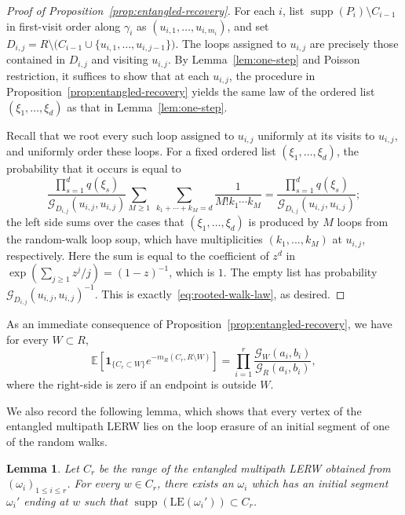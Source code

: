 \documentclass[11pt]{article}
\numberwithin{equation}{section}
\newcommand{\E}{\mathbb{E}}
\newcommand{\1}{\mathbf{1}}
\newcommand{\LE}{\mathrm{LE}}
\newtheorem{lemma}[theorem]{Lemma}
\newcommand{\supp}{\operatorname{supp}}
\newcommand{\one}{\mathbf 1}
\newcommand{\Gc}{\mathcal G}
\begin{document}
\begin{proof}[Proof of Proposition~\ref{prop:entangled-recovery}]
For each $i$, list $\supp(P_i)\setminus C_{i-1}$ in first-visit order along
$\gamma_i$ as $(u_{i,1},\ldots,u_{i,m_i})$, and set
$D_{i,j}=R\setminus\bigl(C_{i-1}\cup \{u_{i,1},\ldots,u_{i,j-1}\}\bigr)$.  The loops assigned to $u_{i,j}$ are precisely those contained in
$D_{i,j}$ and visiting $u_{i,j}$. By Lemma~\ref{lem:one-step} and Poisson restriction, it suffices to show that at each $u_{i,j}$, the procedure in Proposition~\ref{prop:entangled-recovery} yields the same law of the ordered list $(\xi_1,\ldots,\xi_d)$ as that in Lemma~\ref{lem:one-step}.

Recall that we root every such loop assigned to $u_{i,j}$ uniformly at its visits to
$u_{i,j}$, and uniformly order these loops.  For a fixed ordered list
$(\xi_1,\ldots,\xi_d)$, the probability that it occurs is equal to
\[
 \frac{\prod_{s=1}^d q(\xi_s)}{\Gc_{D_{i,j}}(u_{i,j},u_{i,j})}
 \sum_{M\ge1}\ \sum_{k_1+\cdots+k_M=d}
 \frac1{M!k_1\cdots k_M}
 =\frac{\prod_{s=1}^d q(\xi_s)}{\Gc_{D_{i,j}}(u_{i,j},u_{i,j})};
\]
the left side sums over the cases that $(\xi_1,\ldots,\xi_d)$ is produced by $M$ loops from the random-walk loop soup, which have multiplicities $(k_1,...,k_M)$ at $u_{i,j}$, respectively. 
Here the sum is equal to the coefficient of $z^d$ in
$\exp(\sum_{j\ge1}z^j/j)=(1-z)^{-1}$, which is $1$. The empty list has probability
$\Gc_{D_{i,j}}(u_{i,j},u_{i,j})^{-1}$. This is exactly~\eqref{eq:rooted-walk-law}, as desired.
\end{proof}

As an immediate consequence of Proposition~\ref{prop:entangled-recovery}, we have for every $W\subset R$,
\begin{equation}\label{eq:multipath-recovery-at-one}
 \E\left[
  \one_{\{C_r\subset W\}}
  e^{-m_R(C_r,R\setminus W)}
 \right]
 =\prod_{i=1}^r\frac{\Gc_W(a_i,b_i)}{\Gc_R(a_i,b_i)},
\end{equation}
where the right-side is zero if an endpoint is outside $W$.

We also record the following lemma, which shows that every vertex of the entangled multipath LERW lies on the loop erasure of an initial segment of one of the random walks.

\begin{lemma}\label{lem:multipath-initial-segment}
Let $C_r$ be the range of the entangled multipath LERW obtained from
$(\omega_i)_{1\le i\le r}$.  For every \(w\in C_r\), there exists an \(\omega_i\) which has an initial segment \(\omega_i'\) ending at \(w\) such that $\supp\!\left(\LE(\omega_i')\right)\subset C_r$.
\end{lemma}
\end{document}
